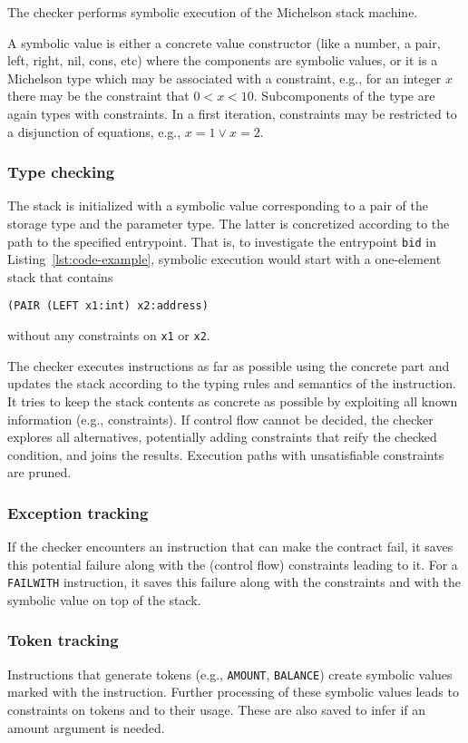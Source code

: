 \documentclass[a4paper]{llncs}
\begin{document}
The checker performs symbolic execution of the Michelson stack
machine.


A symbolic value is either a concrete value
constructor (like a number, a pair, left, right, nil, cons, etc) where
the components are symbolic values, or it is a Michelson type which
may be associated with a constraint, e.g., for an integer $x$ there 
may be the constraint that $0<x<10$. Subcomponents of the type are
again types with constraints. In a first iteration, constraints may be
restricted to a disjunction of equations, e.g., $x=1 \vee x=2$.

\subsubsection{Type checking}
\label{sec:type-checking}

 The stack is initialized with a symbolic value corresponding to a pair
of the storage type and the parameter type. The latter is concretized
according to the path to the specified entrypoint. That is, to
investigate the entrypoint \lstinline/bid/ in
Listing~\ref{lst:code-example}, symbolic execution would start with a
one-element stack that contains
\begin{lstlisting}[language=michelson]
(PAIR (LEFT x1:int) x2:address)
\end{lstlisting}
without any constraints on \texttt{x1} or \texttt{x2}.

The checker executes instructions as far as possible using the
concrete part and updates the stack according to the typing rules and
semantics of the instruction. It tries to keep the
stack contents as concrete as possible by exploiting all known information
(e.g., constraints). If control flow cannot be decided, the checker
explores all alternatives, potentially adding constraints that reify the
checked condition, and joins the results. Execution paths with
unsatisfiable constraints are pruned.

\subsubsection{Exception tracking}
\label{sec:exception-tracking}

If the checker encounters an instruction that can make the contract
fail, it saves this potential failure along with the (control flow) constraints
leading to it. For a \texttt{FAILWITH} instruction, it saves
this failure along with the constraints and with the symbolic value on
top of the stack.

\subsubsection{Token tracking}
\label{sec:token-tracking}

Instructions that generate tokens (e.g., \texttt{AMOUNT},
\texttt{BALANCE}) create symbolic values marked with 
the instruction. Further processing of these symbolic values leads to
constraints on tokens and to their usage. These are also saved to
infer if an amount argument is needed.
\end{document}
